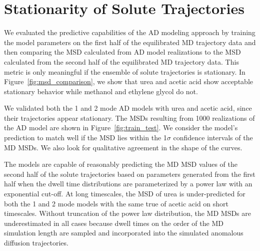 \documentclass{article}
\begin{document}
  \newpage
  
  \section{Stationarity of Solute Trajectories}\label{section:msd_comparison}
  
  We evaluated the predictive capabilities of the AD modeling approach by training
  the model parameters on the first half of the equilibrated MD trajectory data and
  then comparing the MSD calculated from AD model realizations to the MSD calculated
  from the second half of the equilibrated MD trajectory data. This metric is
  only meaningful if the ensemble of solute trajectories is stationary. In 
  Figure~\ref{fig:msd_comparison}, we show that urea and acetic acid show acceptable
  stationary behavior while methanol and ethylene glycol do not.
  
  We validated both the 1 and 2 mode AD models with urea and acetic acid, since their
  trajectories appear stationary. The MSDs resulting from 1000 realizations of the AD
  model are shown in Figure~\ref{fig:train_test}. We consider the model's prediction 
  to match well if the MSD lies within the 1$\sigma$ confidence intervals of the MD MSDs.
  We also look for qualitative agreement in the shape of the curves.
  
  The models are capable of reasonably predicting the MD MSD values of the second
  half of the solute trajectories based on parameters generated from the first half
  when the dwell time distributions are parameterized by a power law with an 
  exponential cut-off. At long timescales, the MSD of urea is under-predicted 
  for both the 1 and 2 mode models with the same true of acetic acid on short 
  timescales. Without truncation of the power law distribution, the MD 
  MSDs are underestimated in all cases because dwell times on the order of the
  MD simulation length are sampled and incorporated into the simulated anomalous
  diffusion trajectories. 
  
\end{document}
